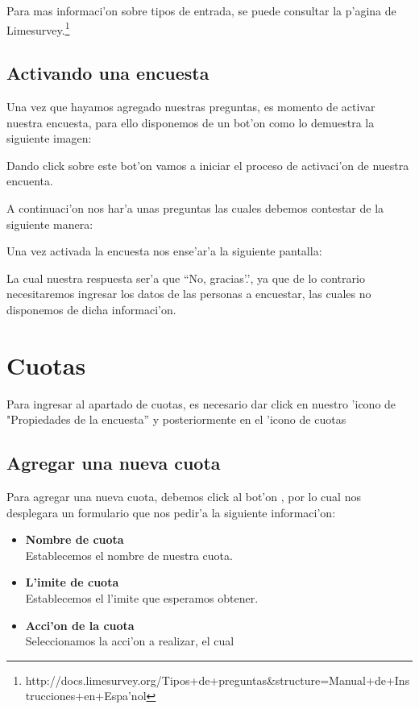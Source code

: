 \documentclass[12pt,spanish]{report}
\begin{document}
Para mas informaci'on sobre tipos de entrada, se puede consultar la p'agina de Limesurvey.\footnote{http://docs.limesurvey.org/Tipos+de+preguntas\&structure=Manual+de+Instrucciones+en+Espa'nol}
\newpage

\subsection {Activando una encuesta}

Una vez que hayamos agregado nuestras preguntas, es momento de activar nuestra encuesta, para ello disponemos de un bot'on como lo demuestra la siguiente imagen:
\par
\centerline{\hbox{}}
\par 

Dando click sobre este bot'on vamos a iniciar el proceso de activaci'on de nuestra encuenta.

A continuaci'on nos har'a unas preguntas las cuales debemos contestar de la siguiente manera:
\par
\centerline{\hbox{}}
\par 


Una vez activada la encuesta nos ense'ar'a la siguiente pantalla:
\par
\centerline{\hbox{}}
\par 

La cual nuestra respuesta ser'a que ``No, gracias'.', ya que de lo contrario necesitaremos ingresar los datos de las personas a encuestar, las cuales no disponemos de dicha informaci'on.

\section {Cuotas}
Para ingresar al apartado de cuotas, es necesario dar click en nuestro 'icono de "Propiedades de la encuesta'' y posteriormente en el 'icono de cuotas 
\newpage
\subsection{Agregar una nueva cuota}
Para agregar una nueva cuota, debemos click al bot'on , por lo cual nos desplegara un formulario que nos pedir'a la siguiente informaci'on:
\begin{itemize}
\item { \bf Nombre de cuota }\\
Establecemos el nombre de nuestra cuota.
\item {\bf L'imite de cuota}\\
Establecemos el l'imite que esperamos obtener.
\item {\bf Acci'on  de la cuota}\\
Seleccionamos la acci'on a realizar, el cual 


\end{itemize}

\end{document}
